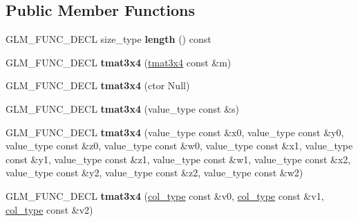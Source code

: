 \subsection*{\-Public \-Member \-Functions}
\begin{DoxyCompactItemize}
\item 
\hypertarget{structglm_1_1detail_1_1tmat3x4_ac4a0e37c7441f30aefc16669642fd47e}{\-G\-L\-M\-\_\-\-F\-U\-N\-C\-\_\-\-D\-E\-C\-L size\-\_\-type {\bfseries length} () const }\label{structglm_1_1detail_1_1tmat3x4_ac4a0e37c7441f30aefc16669642fd47e}

\item 
\hypertarget{structglm_1_1detail_1_1tmat3x4_a0fc4926d8a72adc932b36f0be3c924ee}{\-G\-L\-M\-\_\-\-F\-U\-N\-C\-\_\-\-D\-E\-C\-L {\bfseries tmat3x4} (\hyperlink{structglm_1_1detail_1_1tmat3x4}{tmat3x4} const \&m)}\label{structglm_1_1detail_1_1tmat3x4_a0fc4926d8a72adc932b36f0be3c924ee}

\item 
\hypertarget{structglm_1_1detail_1_1tmat3x4_ada4cb47bbe810d5327a994856d66ba38}{\-G\-L\-M\-\_\-\-F\-U\-N\-C\-\_\-\-D\-E\-C\-L {\bfseries tmat3x4} (ctor \-Null)}\label{structglm_1_1detail_1_1tmat3x4_ada4cb47bbe810d5327a994856d66ba38}

\item 
\hypertarget{structglm_1_1detail_1_1tmat3x4_ad79c02c5d9ba799ee50185a577cff941}{\-G\-L\-M\-\_\-\-F\-U\-N\-C\-\_\-\-D\-E\-C\-L {\bfseries tmat3x4} (value\-\_\-type const \&s)}\label{structglm_1_1detail_1_1tmat3x4_ad79c02c5d9ba799ee50185a577cff941}

\item 
\hypertarget{structglm_1_1detail_1_1tmat3x4_a163812d2dd1aeddf6f36bf5e7f9bec93}{\-G\-L\-M\-\_\-\-F\-U\-N\-C\-\_\-\-D\-E\-C\-L {\bfseries tmat3x4} (value\-\_\-type const \&x0, value\-\_\-type const \&y0, value\-\_\-type const \&z0, value\-\_\-type const \&w0, value\-\_\-type const \&x1, value\-\_\-type const \&y1, value\-\_\-type const \&z1, value\-\_\-type const \&w1, value\-\_\-type const \&x2, value\-\_\-type const \&y2, value\-\_\-type const \&z2, value\-\_\-type const \&w2)}\label{structglm_1_1detail_1_1tmat3x4_a163812d2dd1aeddf6f36bf5e7f9bec93}

\item 
\hypertarget{structglm_1_1detail_1_1tmat3x4_af4a8d8a9f6d1c5b61b7a77041fd3b04d}{\-G\-L\-M\-\_\-\-F\-U\-N\-C\-\_\-\-D\-E\-C\-L {\bfseries tmat3x4} (\hyperlink{structglm_1_1detail_1_1tvec4}{col\-\_\-type} const \&v0, \hyperlink{structglm_1_1detail_1_1tvec4}{col\-\_\-type} const \&v1, \hyperlink{structglm_1_1detail_1_1tvec4}{col\-\_\-type} const \&v2)}\label{structglm_1_1detail_1_1tmat3x4_af4a8d8a9f6d1c5b61b7a77041fd3b04d}


\end{DoxyCompactItemize}
